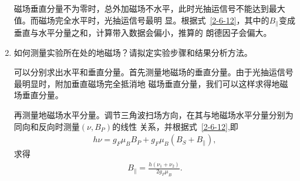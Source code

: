 \documentclass[11pt,a4paper]{article}
\begin{document}
\begin{spacing}{1.3}
\begin{CJK*}{UTF8}{gbsn}
\begin{enumerate}
磁场垂直分量不为零时，总外加磁场不水平，此时光抽运信号不能达到最大值。而磁场完全水平时，光抽运信号最明
显。根据式~\eqref{2-6-12}，其中的$B_{\parallel}$变成垂直与水平分量之和，计算带入数据会偏小，推算的
朗德因子会偏大。
\item  如何测量实验所在处的地磁场？请拟定实验步骤和结果分析方法。\par
可以分别求出水平和垂直分量。首先测量地磁场的垂直分量。由于光抽运信号最明显时，附加垂直磁场完全抵消地
磁场垂直分量，我们可以这样求得地磁场垂直分量。\par 
再测量地磁场水平分量。调节三角波扫场方向，在其与地磁场水平分量分别为同向和反向时测量$(\nu,B_P)$的线性
关系，并根据式~\eqref{2-6-12},即
\begin{eqnarray} 
h\nu=g_F\mu_BB_P+g_F\mu_B(B_S+B_{\parallel}),
\end{eqnarray}
求得
\begin{eqnarray} 
B_{\parallel}=\frac{h(\nu_1+\nu_2)}{2 g_F\mu_B}.
\end{eqnarray}
\end{enumerate}




\end{CJK*}
%
\end{spacing}
\end{document}
